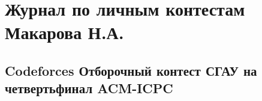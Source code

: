 \documentclass[a4paper,12pt]{article}
\begin{document}
%
%

\newpage
\section{Журнал по личным контестам Макарова Н.А.}

%
%

\subsection{Codeforces Отборочный контест СГАУ на четвертьфинал ACM-ICPC}
\end{document}

